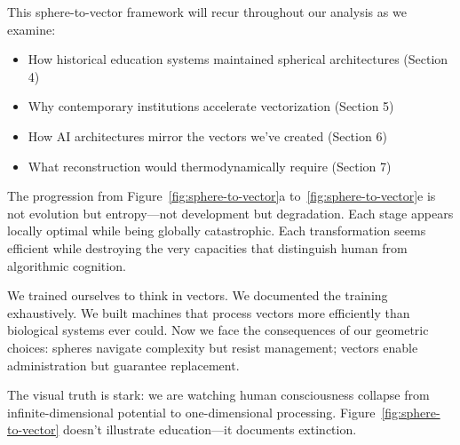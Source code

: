 This sphere-to-vector framework will recur throughout our analysis as we examine:
\begin{itemize}
\item How historical education systems maintained spherical architectures (Section 4)
\item Why contemporary institutions accelerate vectorization (Section 5)
\item How AI architectures mirror the vectors we've created (Section 6)
\item What reconstruction would thermodynamically require (Section 7)
\end{itemize}

The progression from Figure~\ref{fig:sphere-to-vector}a to~\ref{fig:sphere-to-vector}e is not evolution but entropy---not development but degradation. Each stage appears locally optimal while being globally catastrophic. Each transformation seems efficient while destroying the very capacities that distinguish human from algorithmic cognition.

We trained ourselves to think in vectors. We documented the training exhaustively. We built machines that process vectors more efficiently than biological systems ever could. Now we face the consequences of our geometric choices: spheres navigate complexity but resist management; vectors enable administration but guarantee replacement.

The visual truth is stark: we are watching human consciousness collapse from infinite-dimensional potential to one-dimensional processing. Figure~\ref{fig:sphere-to-vector} doesn't illustrate education---it documents extinction.